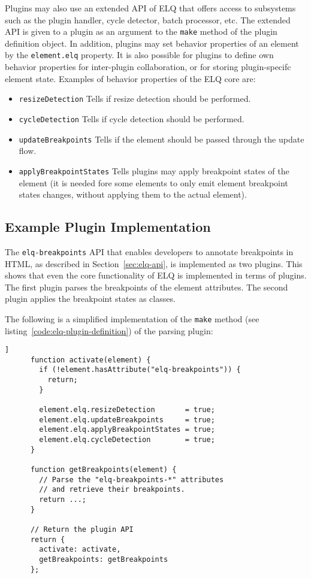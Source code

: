 \documentclass{acm_proc_article-sp}
\newcommand{\code}[1]{\texttt{#1}}
\newcommand{\elq}{ELQ}
\begin{document}
  Plugins may also use an extended API of \elq{} that offers access to subsystems such as the plugin handler, cycle detector, batch processor, etc.
  The extended API is given to a plugin as an argument to the \code{make} method of the plugin definition object.
  In addition, plugins may set behavior properties of an element by the \code{element.elq} property.
  It is also possible for plugins to define own behavior properties for inter-plugin collaboration, or for storing plugin-specifc element state.
  Examples of behavior properties of the \elq{} core are:
  \begin{itemize}
    \item \code{resizeDetection} Tells if resize detection should be performed.
    \item \code{cycleDetection} Tells if cycle detection should be performed.
    \item \code{updateBreakpoints} Tells if the element should be passed through the update flow.
    \item \code{applyBreakpointStates} Tells plugins may apply breakpoint states of the element (it is needed fore some elements to only emit element breakpoint states changes, without applying them to the actual element).
  \end{itemize}

  \subsection{Example Plugin Implementation}
    The \code{elq-breakpoints} API that enables developers to annotate breakpoints in HTML, as described in Section~\ref{sec:elq-api}, is implemented as two plugins.
    This shows that even the core functionality of \elq{} is implemented in terms of plugins.
    The first plugin parses the breakpoints of the element attributes.
    The second plugin applies the breakpoint states as classes.

    The following is a simplified implementation of the \code{make} method (see listing~\ref{code:elq-plugin-definition}) of the parsing plugin:

    \begin{lstlisting}[gobble=6,caption={},captionpos=b,label={}]]
      function activate(element) {
        if (!element.hasAttribute("elq-breakpoints")) {
          return;
        }

        element.elq.resizeDetection       = true;
        element.elq.updateBreakpoints     = true;
        element.elq.applyBreakpointStates = true;
        element.elq.cycleDetection        = true;
      }

      function getBreakpoints(element) {
        // Parse the "elq-breakpoints-*" attributes
        // and retrieve their breakpoints.
        return ...;
      }

      // Return the plugin API
      return {
        activate: activate,
        getBreakpoints: getBreakpoints
      };
    \end{lstlisting}
\end{document}
